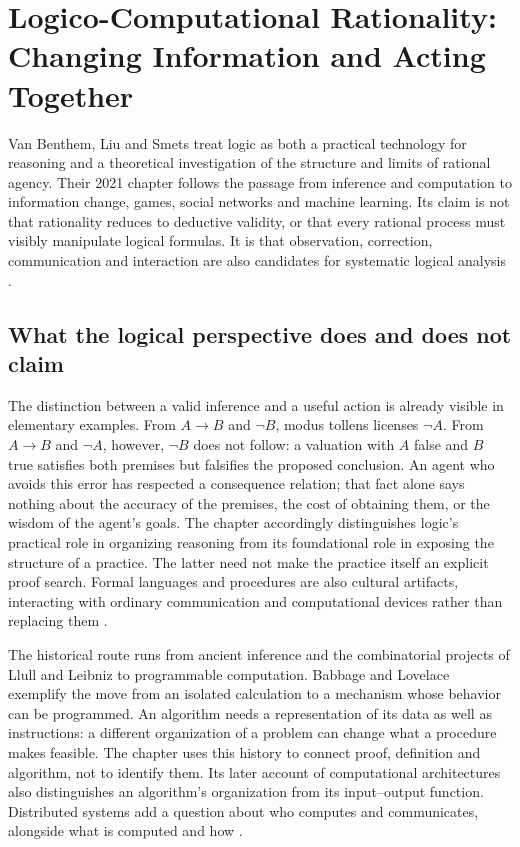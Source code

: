 \chapter{Logico-Computational Rationality: Changing Information and Acting Together}
\label{sec:p08-rationality-2-6}

Van Benthem, Liu and Smets treat logic as both a practical technology for
reasoning and a theoretical investigation of the structure and limits of
rational agency. Their 2021 chapter follows the passage from inference
and computation to information change, games, social networks and machine
learning. Its claim is not that rationality reduces to deductive validity,
or that every rational process must visibly manipulate logical formulas.
It is that observation, correction, communication and interaction are
also candidates for systematic logical analysis
\cite[pp.~185--194]{VanBenthemLiuSmets2021Logico}.

\section{What the logical perspective does and does not claim}

The distinction between a valid inference and a useful action is already
visible in elementary examples. From \(A\to B\) and \(\neg B\), modus
tollens licenses \(\neg A\). From \(A\to B\) and \(\neg A\), however,
\(\neg B\) does not follow: a valuation with \(A\) false and \(B\)
true satisfies both premises but falsifies the proposed conclusion.
An agent who avoids this error has respected a consequence relation;
that fact alone says nothing about the accuracy of the premises, the
cost of obtaining them, or the wisdom of the agent's goals. The chapter
accordingly distinguishes logic's practical role in organizing reasoning
from its foundational role in exposing the structure of a practice.
The latter need not make the practice itself an explicit proof search.
Formal languages and procedures are also cultural artifacts, interacting
with ordinary communication and computational devices rather than
replacing them \cite[pp.~185--186]{VanBenthemLiuSmets2021Logico}.

The historical route runs from ancient inference and the combinatorial
projects of Llull and Leibniz to programmable computation. Babbage and
Lovelace exemplify the move from an isolated calculation to a mechanism
whose behavior can be programmed. An algorithm needs a representation
of its data as well as instructions: a different organization of a
problem can change what a procedure makes feasible. The chapter uses
this history to connect proof, definition and algorithm, not to identify
them. Its later account of computational architectures also distinguishes
an algorithm's organization from its input--output function. Distributed
systems add a question about who computes and communicates, alongside
what is computed and how \cite[pp.~186--188]{VanBenthemLiuSmets2021Logico}.

